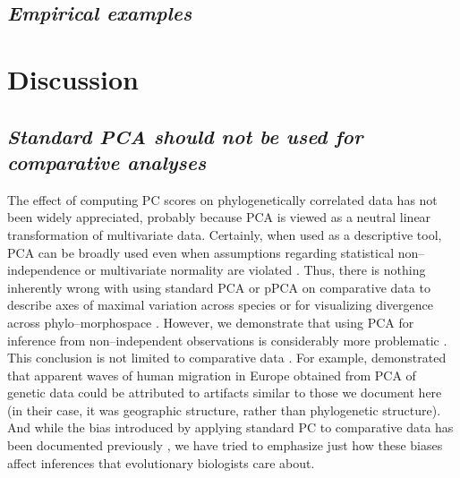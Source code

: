 \documentclass[a4paper,12pt]{article}
\begin{document}
\subsection{\emph{Empirical examples}}

\section{Discussion}
\subsection{\emph{Standard PCA should not be used for comparative analyses}} 

The effect of computing PC scores on phylogenetically correlated data has not been widely appreciated, probably because PCA is viewed as a neutral linear transformation of multivariate data. Certainly, when used as a descriptive tool, PCA can be broadly used even when assumptions regarding statistical non--independence or multivariate normality are violated \citep{Jolliffe2002}. Thus, there is nothing inherently wrong with using standard PCA or pPCA on comparative data to describe axes of maximal variation across species or for visualizing divergence across phylo--morphospace \citep{Sidlauskas2008}. However, we demonstrate that using PCA for inference from non--independent observations is considerably more problematic \citep{Jolliffe2002}. This conclusion is not limited to comparative data \citep[see][]{Richman1986, Podani2002, Novembre, Bookstein2012}. For example, \citet{Novembre} demonstrated that apparent waves of human migration in Europe obtained from PCA of genetic data \citep[e.g.,][]{Cavalli} could be attributed to artifacts similar to those we document here (in their case, it was geographic structure, rather than phylogenetic structure). And while the bias introduced by applying standard PC to comparative data has been documented previously \citep{Revell2008, Polly2013}, we have tried to emphasize just how these biases affect inferences that evolutionary biologists care about.
\end{document}
